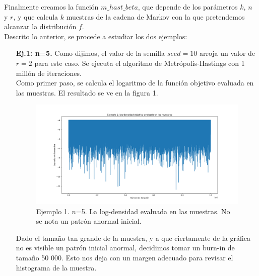 \documentclass[letterpaper]{article}
\newcommand{\1}{\mathds{1}}
\theoremstyle{definition}
\theoremstyle{definition}
\theoremstyle{definition}
\theoremstyle{definition}
\theoremstyle{definition}
\begin{document}
\begin{enumerate}
    Finalmente creamos la función $m\_hast\_beta$, que depende de los parámetros $k$, $n$ y $r$, 
    y que calcula $k$ muestras de la cadena de Markov con la que pretendemos alcanzar la distribución $f$.\\

    Descrito lo anterior, se procede a estudiar los dos ejemplos:

    \begin{itemize}
        \item[\textbf{Ej.1: n=5.}] Como dijimos, el valor de la semilla $seed=10$ arroja un valor de $r=2$ para este caso. 
        Se ejecuta el algoritmo de Metrópolis-Hastings con 1 millón de iteraciones.\\

        Como primer paso, se calcula el logaritmo de la función objetivo evaluada en las muestras. El resultado se ve en la 
        figura 1.

        \begin{figure}[h!]
            \centering
            \includegraphics[width=\linewidth]{1.png}
            \caption{Ejemplo 1. $n$=5. La log-densidad evaluada en las muestras. No se nota un patrón anormal inicial.}
        \end{figure} 

        Dado el tamaño tan grande de la muestra, y a que ciertamente de la gráfica no es visible un patrón inicial anormal, 
        decidimos tomar un burn-in de tamaño 50 000. Esto nos deja con un margen adecuado para revisar el histograma de la muestra.
        \newline


\end{itemize}
\end{enumerate}
\end{document}
